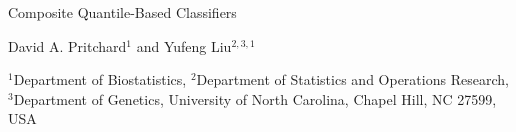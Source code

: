 \documentclass{article}
\begin{document}

\begin{center}

  {\LARGE Composite Quantile-Based Classifiers} \vspace{5mm}

  {\large David A. Pritchard$^1$ and Yufeng Liu$^{2,3,1}$} \vspace{5mm}

  {\large
    $^1$Department of Biostatistics,
    $^2$Department of Statistics and Operations Research,
    $^3$Department of Genetics,
    University of North Carolina, Chapel Hill, NC 27599, USA
  }

\end{center}

\begin{abstract}
  
\end{abstract}











% 








\end{document}
